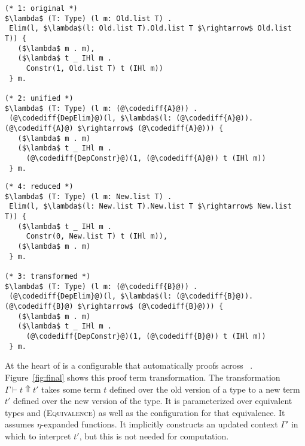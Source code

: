 \begin{figure*}
\begin{minipage}{0.49\textwidth}
\begin{lstlisting}
(* 1: original *)
$\lambda$ (T: Type) (l m: Old.list T) .
 Elim(l, $\lambda$(l: Old.list T).Old.list T $\rightarrow$ Old.list T)) {
   ($\lambda$ m . m),
   ($\lambda$ t _ IHl m .
     Constr(1, Old.list T) t (IHl m))
 } m.

(* 2: unified *)
$\lambda$ (T: Type) (l m: (@\codediff{A}@)) .
 (@\codediff{DepElim}@)(l, $\lambda$(l: (@\codediff{A}@)).(@\codediff{A}@) $\rightarrow$ (@\codediff{A}@))) {
   ($\lambda$ m . m)
   ($\lambda$ t _ IHl m .
     (@\codediff{DepConstr}@)(1, (@\codediff{A}@)) t (IHl m))
 } m.
\end{lstlisting}
\end{minipage}
\hfill
\begin{minipage}{0.49\textwidth}
\begin{lstlisting}
(* 4: reduced *)
$\lambda$ (T: Type) (l m: New.list T) .
 Elim(l, $\lambda$(l: New.list T).New.list T $\rightarrow$ New.list T)) {
   ($\lambda$ t _ IHl m .
     Constr(0, New.list T) t (IHl m)),
   ($\lambda$ m . m)
 } m.

(* 3: transformed *)
$\lambda$ (T: Type) (l m: (@\codediff{B}@)) .
 (@\codediff{DepElim}@)(l, $\lambda$(l: (@\codediff{B}@)).(@\codediff{B}@) $\rightarrow$ (@\codediff{B}@))) {
   ($\lambda$ m . m)
   ($\lambda$ t _ IHl m .
     (@\codediff{DepConstr}@)(1, (@\codediff{B}@)) t (IHl m))
 } m.
\end{lstlisting}
\end{minipage}
\caption{Swapping cases of the append function, counterclockwise, the input term: 1) unmodified, 2) unified with the configuration, 3) ported to the new version of the type, and 4) reduced to the output.}
\label{fig:appswap1}
\end{figure*}

At the heart of \toolnamec is a configurable  that automatically 
proofs across ~\href{https://github.com/uwplse/pumpkin-pi/blob/v2.0.0/plugin/src/automation/lift/lift.ml}{}.
Figure~\ref{fig:final} shows this proof term transformation.
The transformation $\Gamma \vdash t \Uparrow t'$ takes some term $t$ defined over the old version of a type
to a new term $t'$ defined over the new version of the type.
It is parameterized over equivalent types \Aa and \B (\textsc{Equivalence})
as well as the configuration for that equivalence.
It assumes $\eta$-expanded functions. %
It implicitly constructs an updated context $\Gamma'$ in which to interpret $t'$, but this is not needed for computation.


